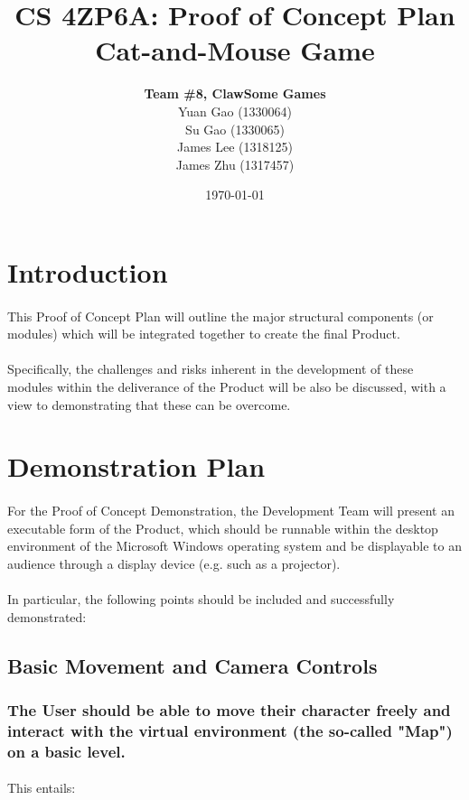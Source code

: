\documentclass{article}
\title{CS 4ZP6A: Proof of Concept Plan\\Cat-and-Mouse Game}
\author{\textbf{Team \#8, ClawSome Games}
		\\ Yuan Gao (1330064)
		\\ Su Gao (1330065)
		\\ James Lee (1318125)
		\\ James Zhu (1317457) 
}
\date{\today}
\begin{document}
\maketitle
\newpage
\section{Introduction}
\paragraph{}This Proof of Concept Plan will outline the major structural components (or modules) which will be integrated together to create the final Product.
\paragraph{} Specifically, the challenges and  risks inherent in the development of these modules within the deliverance of the Product will be also be discussed, with a view to demonstrating that these can be overcome.

\section{Demonstration Plan}
\paragraph{} For the Proof of Concept Demonstration, the Development Team will present an executable form of the Product, which should be runnable within the desktop environment of the Microsoft Windows operating system and  be displayable to an audience through a display device (e.g. such as a projector).
\paragraph{}In particular, the following points should be included and successfully demonstrated:
\subsection{Basic Movement and Camera Controls}
\subsubsection{\textbf{The User should be able to move their character freely and interact with the virtual environment (the so-called "Map") on a basic level.}}
\paragraph{}This entails:
\end{document}
